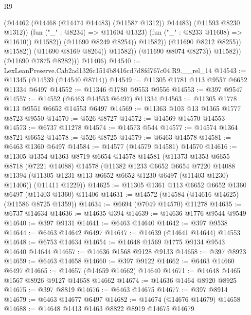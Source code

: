 \begin{lexlean}{R9}
\begin{coremodule}
                                          (@14462 (@14468 (@14474 @14483) (@11587 @1312)) @14483)
                                          (@11593 @8230 @1312))
                                        (fun ("_" : @8234) => @11604 @1323)
                                        (fun ("_" : @8233 @11608) => @11610))
                                      @11582))
                                  (@11690 @8249 @8254))
                                @11582))
                            (@11690 @8212 @8255))
                          @11582))
                      (@11690 @8169 @8264))
                    @11582))
                (@11690 @8074 @8273))
              @11582))
          (@11690 @7875 @8282)))
      @11406)
@14540 := LexLeanPreserve.Cab2ad1326c1514b8416cd7d8fd767c04.R9.__rel_14
@14543 := @11345 (@14539 (@14540 @8714))
@14549 := @11305 @1781 @113 @9557 @6652 @11334 @6497
@14552 := @11346 @1780 @9553 @9556
@14553 := @397 @9547
@14557 := @14552 (@6463 @14553 @6497) @11334
@14563 := @11305 @1778 @113 @9551 @6652 @14553 @6497
@14569 := @11363 @103 @13 @1365 @1777 @8723 @9550
@14570 := @526 @8727
@14572 := @14569 @14570 @14553
@14573 := @6737 @11278
@14574 := @14573 @544
@14577 := @14574 @1364 @8721 @6652
@14578 := @526 @8725
@14579 := @6463 @14578
@14581 := @6463 @1360 @6497
@14584 := @14577 (@14579 @14581) @14570
@14616 := @11305
    @1354
    @1363
    @8719
    @6654
    @14578
    @14581
    (@11373
      @1353
      @6655
      @8718
      (@7221 @14088)
      @14578
      (@11382
        @1233
        @6652
        @6654
        @7220
        @14088
        @11394
        (@11305 @1231 @113 @6652 @6652 @1230 @6497 (@11403 @1230) @11406))
      (@11411 @1229))
@14625 := @11305 @1361 @113 @6652 @6652 @1360 @6497 (@11403 @1360) @11406
@14631 := @14572 (@14584 (@14616 @14625) (@11586 @8725 @1359))
@14634 := @6694 (@7049 @14570) @11278
@14635 := @6737 @14634
@14636 := @14635 @394
@14639 := @14636 @1776 @9544 @9549
@14640 := @397 @9131
@14641 := @6463 @14640
@14642 := @397 @9538
@14644 := @6463 @14642 @6497
@14647 := @14639 (@14641 @14644) @14553
@14648 := @6753 @14634
@14654 := @14648 @1569 @1775 @9134 @9543 @14640 @14644
@14657 := @14636 @1568 @9128 @9133
@14658 := @397 @8923
@14659 := @6463 @14658
@14660 := @397 @9122
@14662 := @6463 @14660 @6497
@14665 := @14657 (@14659 @14662) @14640
@14671 := @14648 @1465 @1567 @8926 @9127 @14658 @14662
@14674 := @14636 @1464 @8920 @8925
@14675 := @397 @8819
@14676 := @6463 @14675
@14677 := @397 @8914
@14679 := @6463 @14677 @6497
@14682 := @14674 (@14676 @14679) @14658
@14688 := @14648 @1413 @1463 @8822 @8919 @14675 @14679

\end{coremodule}
\end{lexlean}
